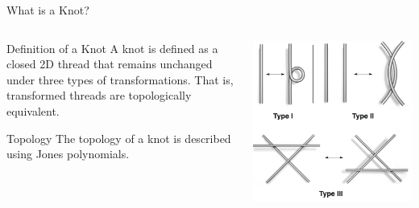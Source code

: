 \begin{frame}{What is a Knot?}

\begin{columns}
\begin{column}{0.5\linewidth}
\begin{block}{Definition of a Knot}
A knot is defined as a closed 2D thread that remains unchanged under three types of transformations. That is, transformed threads are topologically equivalent.
\end{block}

\begin{block}{Topology}
The topology of a knot is described using Jones polynomials.
\end{block}
\end{column}

\begin{column}{0.5\linewidth}
\includegraphics[height=1\linewidth]{img/hnurki_peracii.png}
\end{column}
\end{columns}
\end{frame}

